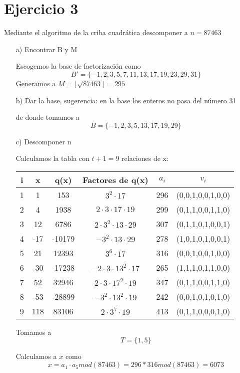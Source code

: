 \documentclass[12pt, letterpaper]{article}
\begin{document}
\section*{Ejercicio 3}
Mediante el algoritmo de la criba cuadrática descomponer a $n = 87463$
\begin{itemize}
\item[a)] Encontrar B y M

Escogemos la base de factorización como \[B' = \{-1,2,3,5,7,11,13,17,19,23,29,31\}\] 
Generamos a $M = \lfloor \sqrt{87463} \rfloor = 295$
\item[b)] Dar la base, sugerencia: en la base los enteros no pasa del número 31

de donde tomamos a \[B = \{-1,2,3,5,13,17,19,29\}\]
\item[c)] Descomponer n

Calculamos la tabla con $t+1 = 9$ relaciones de x:


\begin{center}

\begin{tabular}{|c|c|c|c|c|c|}
\hline 
i & x & q(x) & Factores de q(x) & $a_i$ & $v_i$\\ 
\hline 
1 & 1 & 153 & $3^2\cdot 17$ & 296 & (0,0,1,0,0,1,0,0)\\ 
\hline
2 & 4 & 1938& $2\cdot3\cdot17\cdot19$ & 299 & (0,1,1,0,0,1,1,0)\\ 
\hline 
3 & 12 & 6786 & $2\cdot3^2\cdot 13\cdot29$ & 307 & (0,1,1,0,1,0,0,1)\\ 
\hline
4 & -17 & -10179 & $-3^2\cdot 13 \cdot 29$ & 278 & (1,0,1,0,1,0,0,1)\\ 
\hline
5 & 21 & 12393 & $3^6\cdot 17$ & 316 & (0,0,1,0,0,1,0,0)\\ 
\hline
6 & -30 & -17238 & $-2\cdot3\cdot13^2\cdot17$ & 265 & (1,1,1,0,1,1,0,0)\\ 
\hline
7 & 52 & 32946 & $2\cdot3\cdot17^2\cdot19$ & 347 & (0,1,1,0,0,1,1,0)\\ 
\hline
8 & -53 & -28899 & $-3^2\cdot 13^2 \cdot 19$ & 242& (0,0,1,0,1,0,1,0)\\ 
\hline
9 & 118 & 83106 & $2\cdot3^7\cdot 19$ & 413& (0,1,1,0,0,0,1,0)\\ 
\hline
\end{tabular} 
\end{center}

Tomamos a \[T = \{1,5\}\]

Calculamos a $x$ como \[x = a_1 \cdot a_5 mod (87463) = 296*316 mod (87463) = 6073 \]


\end{itemize}
\end{document}
